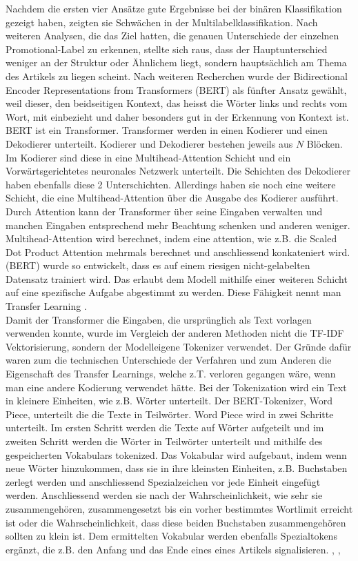 Nachdem die ersten vier Ansätze gute Ergebnisse bei der binären Klassifikation gezeigt haben, zeigten sie Schwächen in der Multilabelklassifikation. Nach weiteren Analysen, die das Ziel hatten, die genauen Unterschiede der einzelnen Promotional-Label zu erkennen, stellte sich raus, dass der Hauptunterschied weniger an der Struktur oder Ähnlichem liegt, sondern hauptsächlich am Thema des Artikels zu liegen scheint. Nach weiteren Recherchen wurde der Bidirectional Encoder Representations from Transformers (BERT) als fünfter Ansatz gewählt, weil dieser, den beidseitigen Kontext, das heisst die Wörter links und rechts vom Wort, mit einbezieht und daher besonders gut in der Erkennung von Kontext ist.
\\
BERT ist ein Transformer. Transformer werden in einen Kodierer und einen Dekodierer unterteilt. Kodierer und Dekodierer bestehen jeweils aus $N$ Blöcken. Im Kodierer sind diese in eine Multihead-Attention Schicht und ein Vorwärtsgerichtetes neuronales Netzwerk unterteilt. Die Schichten des Dekodierer haben ebenfalls diese 2 Unterschichten. Allerdings haben sie noch eine weitere Schicht, die eine Multihead-Attention über die Ausgabe des Kodierer ausführt. Durch Attention kann der Transformer über seine Eingaben verwalten und manchen Eingaben entsprechend mehr Beachtung schenken und anderen weniger. Multihead-Attention wird berechnet, indem eine attention, wie z.B. die Scaled Dot Product Attention  \cite{Vaswani2017} mehrmals berechnet und anschliessend konkateniert wird.
(BERT) wurde so entwickelt, dass es auf einem riesigen nicht-gelabelten Datensatz trainiert wird. Das erlaubt dem Modell mithilfe einer weiteren Schicht auf eine spezifische Aufgabe abgestimmt zu werden. Diese Fähigkeit nennt man Transfer Learning \cite{Devlin2018}. \\
Damit der Transformer die Eingaben, die ursprünglich als Text vorlagen verwenden konnte, wurde im Vergleich der anderen Methoden nicht die TF-IDF Vektorisierung, sondern der Modelleigene Tokenizer verwendet. Der Gründe dafür waren zum die technischen Unterschiede der Verfahren und zum Anderen die Eigenschaft des Transfer Learnings, welche z.T. verloren gegangen wäre, wenn man eine andere Kodierung verwendet hätte. Bei der Tokenization wird ein Text in kleinere Einheiten, wie z.B. Wörter unterteilt. Der BERT-Tokenizer, Word Piece, unterteilt die die Texte in Teilwörter. Word Piece wird in zwei Schritte unterteilt. Im ersten Schritt werden die Texte auf Wörter aufgeteilt und im zweiten Schritt werden die Wörter in Teilwörter unterteilt und mithilfe des gespeicherten Vokabulars tokenized. Das Vokabular wird aufgebaut, indem wenn neue Wörter hinzukommen, dass sie in ihre kleinsten Einheiten, z.B. Buchstaben zerlegt werden und anschliessend Spezialzeichen vor jede Einheit eingefügt werden. Anschliessend werden sie nach der Wahrscheinlichkeit, wie sehr sie zusammengehören, zusammengesetzt bis ein vorher bestimmtes Wortlimit erreicht ist oder die Wahrscheinlichkeit, dass diese beiden Buchstaben zusammengehören sollten zu klein ist. Dem ermittelten Vokabular werden ebenfalls Spezialtokens ergänzt, die z.B. den Anfang und das Ende eines eines Artikels signalisieren. \cite{DBLP:journals/corr/abs-2012-15524}, \cite{DBLP:journals/corr/SennrichHB15}, \cite{6289079}

